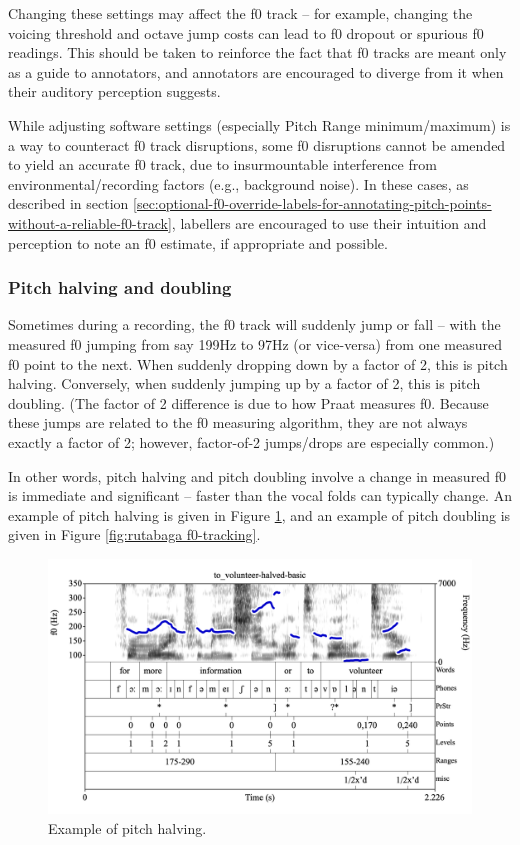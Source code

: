 \documentclass[11pt, twoside]{memoir}
\begin{document}
Changing these settings may affect the f0 track – for example, changing the voicing threshold and octave jump costs can lead to f0 dropout or spurious f0 readings. This should be taken to reinforce the fact that f0 tracks are meant only as a guide to annotators, and annotators are encouraged to diverge from it when their auditory perception suggests. 

While adjusting software settings (especially Pitch Range minimum\slash maximum) is a way to counteract f0 track disruptions, some f0 disruptions cannot be amended to yield an accurate f0 track, due to insurmountable interference from environmental\slash recording factors (e.g., background noise). In these cases, as described in section \ref{sec:optional-f0-override-labels-for-annotating-pitch-points-without-a-reliable-f0-track}, labellers are encouraged to use their intuition and perception to note an f0 estimate, if appropriate and possible. 

\subsubsection{Pitch halving and doubling}\label{sec:pitch-halving-and-doubling}

Sometimes during a recording, the f0 track will suddenly jump or fall – with the measured f0 jumping from say 199Hz to 97Hz (or vice-versa) from one measured f0 point to the next. When suddenly dropping down by a factor of 2, this is pitch halving. Conversely, when suddenly jumping up by a factor of 2, this is pitch doubling. (The factor of 2 difference is due to how Praat measures f0. Because these jumps are related to the f0 measuring algorithm, they are not always exactly a factor of 2; however, factor-of-2 jumps\slash drops are especially common.) 

In other words, pitch halving and pitch doubling involve a change in measured f0 is immediate and significant – faster than the vocal folds can typically change. An example of pitch halving is given in Figure \ref{fig:to volunteer-halved f0-tracking}, and an example of pitch doubling is given in Figure \ref{fig:rutabaga f0-tracking}.

\begin{figure}[H]
\centering
%
\includegraphics[width=.875\linewidth]{Appendix-to_volunteer-halved.png}
%
\caption{Example of pitch halving.%
\label{fig:to volunteer-halved f0-tracking}%
%
}
\end{figure}
\end{document}
